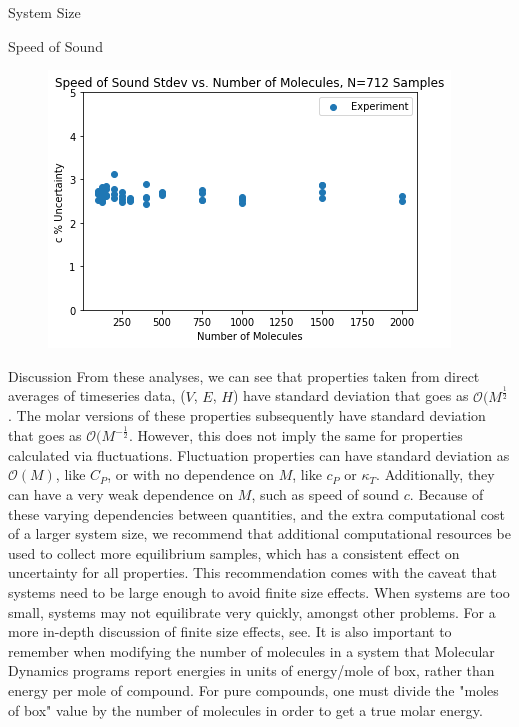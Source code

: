 \documentclass[aps,pre,twocolumn,nofootinbib,superscriptaddress,linenumbers,10pt, draft,tightenlines]{revtex4-1}
\begin{document}
\begin{subsection}{System Size}
\begin{subsubsection}{Speed of Sound}
\begin{figure}[H]
\includegraphics[width=\textwidth]{../figures/speed_of_sound_vs_M.png}
\end{figure}

\end{subsubsection}
\begin{subsubsection}{Discussion}
From these analyses, we can see that properties taken from direct averages of timeseries data, ($V$, $E$, $H$) have standard deviation that goes as $\mathcal{O}(M^{\frac{1}{2}}$.  The molar versions of these properties subsequently have standard deviation that goes as $\mathcal{O}(M^{-\frac{1}{2}}$.  However, this does not imply the same for properties calculated via fluctuations.  Fluctuation properties can have standard deviation as $\mathcal{O}(M)$, like $C_P$, or with no dependence on $M$, like $c_P$ or $\kappa_T$.  Additionally, they can have a very weak dependence on $M$, such as speed of sound $c$.  Because of these varying dependencies between quantities, and the extra computational cost of a larger system size, we recommend that additional computational resources be used to collect more equilibrium samples, which has a consistent effect on uncertainty for all properties.  This recommendation comes with the caveat that systems need to be large enough to avoid finite size effects.  When systems are too small, systems may not equilibrate very quickly, amongst other problems.  For a more in-depth discussion of finite size effects, see. %
It is also important to remember when modifying the number of molecules in a system that Molecular Dynamics programs report energies in units of energy/mole of box, rather than energy per mole of compound.  For pure compounds, one must divide the "moles of box" value by the number of molecules in order to get a true molar energy.

\end{subsubsection}


\end{subsection}
\end{document}
